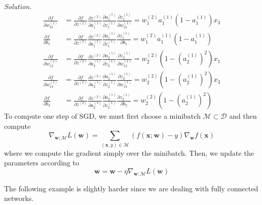 \documentclass{article}
\theoremstyle{definition}
\theoremstyle{remark}
\theoremstyle{definition}
\newenvironment{solution}{\noindent \textit{Solution.}}{}
\begin{document}
\begin{solution}
\begin{align*}
    \frac{\partial f}{\partial w_{31}^{(1)}} & = \frac{\partial f}{\partial z^{(2)}} \frac{\partial z^{(2)}}{\partial a^{(1)}_1} \frac{\partial a^{(1)}_1}{\partial z_1^{(1)}} \frac{\partial z_1^{(1)}}{\partial w_{31}^{(1)}} = w_1^{(2)} a_1^{(1)} (1 - a_1^{(1)}) x_3\\
    \frac{\partial f}{\partial b_{1}} & = \frac{\partial f}{\partial z^{(2)}} \frac{\partial z^{(2)}}{\partial a^{(1)}_1} \frac{\partial a^{(1)}_1}{\partial z_1^{(1)}} \frac{\partial z_1^{(1)}}{\partial b_{1}}  = w_1^{(2)} a_1^{(1)} (1 - a_1^{(1)}) \\
    \frac{\partial f}{\partial w_{12}^{(1)}} & = \frac{\partial f}{\partial z^{(2)}} \frac{\partial z^{(2)}}{\partial a^{(1)}_2} \frac{\partial a^{(1)}_2}{\partial z_2^{(1)}} \frac{\partial z_2^{(1)}}{\partial w_{12}^{(1)}} = w_2^{(2)} (1 - (a_2^{(1)})^2 ) x_1\\
    \frac{\partial f}{\partial w_{13}^{(1)}} & = \frac{\partial f}{\partial z^{(2)}} \frac{\partial z^{(2)}}{\partial a^{(1)}_2} \frac{\partial a^{(1)}_2}{\partial z_2^{(1)}} \frac{\partial z_2^{(1)}}{\partial w_{13}^{(1)}} = w_2^{(2)} (1 - (a_2^{(1)})^2 ) x_3 \\
    \frac{\partial f}{\partial b_{2}} & = \frac{\partial f}{\partial z^{(2)}} \frac{\partial z^{(2)}}{\partial a^{(1)}_2} \frac{\partial a^{(1)}_2}{\partial z_2^{(1)}} \frac{\partial z_2^{(1)}}{\partial b_{2}} = w_2^{(2)} (1 - (a_2^{(1)})^2 )
\end{align*}
To compute one step of SGD, we must first choose a minibatch $\mathcal{M} \subset \mathcal{D}$ and then compute 
\[\nabla_{\mathbf{w}; \mathcal{M}} L(\mathbf{w}) = \sum_{(\mathbf{x}, y) \in \mathcal{M}} (f(\mathbf{x}; \mathbf{w}) - y) \nabla_{\mathbf{w}} f(\mathbf{x})\] 
where we compute the gradient simply over the minibatch. Then, we update the parameters according to 
\[\mathbf{w} = \mathbf{w} - \eta \nabla_{\mathbf{w}; \mathcal{M}} L(\mathbf{w}) \]
\end{solution}

The following example is slightly harder since we are dealing with fully connected networks. 
\end{document}
